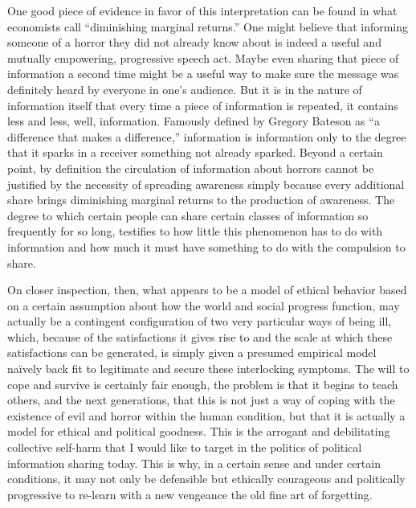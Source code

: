 \documentclass[a4paper,12pt,margin=.5in]{article}
\begin{document}
One good piece of evidence in favor of this interpretation can be found
in what economists call ``diminishing marginal returns.'' One might
believe that informing someone of a horror they did not already know
about is indeed a useful and mutually empowering, progressive speech
act. Maybe even sharing that piece of information a second time might be
a useful way to make sure the message was definitely heard by everyone
in one's audience. But it is in the nature of information itself that
every time a piece of information is repeated, it contains less and
less, well, information. Famously defined by Gregory Bateson as ``a
difference that makes a difference,'' information is information only to
the degree that it sparks in a receiver something not already sparked.
Beyond a certain point, by definition the circulation of information
about horrors cannot be justified by the necessity of spreading
awareness simply because every additional share brings diminishing
marginal returns to the production of awareness. The degree to which
certain people can share certain classes of information so frequently
for so long, testifies to how little this phenomenon has to do with
information and how much it must have something to do with the
compulsion to share.

On closer inspection, then, what appears to be a model of ethical
behavior based on a certain assumption about how the world and social
progress function, may actually be a contingent configuration of two
very particular ways of being ill, which, because of the satisfactions
it gives rise to and the scale at which these satisfactions can be
generated, is simply given a presumed empirical model naïvely back fit
to legitimate and secure these interlocking symptoms. The will to cope
and survive is certainly fair enough, the problem is that it begins to
teach others, and the next generations, that this is not just a way of
coping with the existence of evil and horror within the human condition,
but that it is actually a model for ethical and political goodness. This
is the arrogant and debilitating collective self-harm that I would like
to target in the politics of political information sharing today. This
is why, in a certain sense and under certain conditions, it may not only
be defensible but ethically courageous and politically progressive to
re-learn with a new vengeance the old fine art of forgetting.
\end{document}
